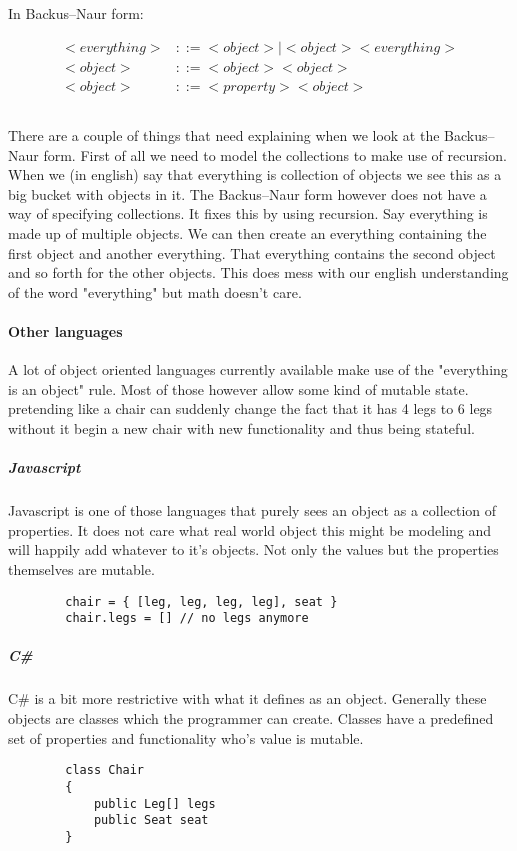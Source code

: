 \documentclass{scrartcl}
\begin{document}
    In Backus–Naur form:

    \begin{align*}
         <everything> &::= <object> | <object><everything> \\
         <object> &::= <object><object> \\
         <object> &::= <property><object> \\
    \end{align*}

    \subparagraph{}
    There are a couple of things that need explaining when we look
    at the Backus–Naur form. First of all we need to model the collections
    to make use of recursion. When we (in english) say that everything is 
    collection of objects we see this as a big bucket with objects in it.
    The Backus–Naur form however does not have a way of specifying 
    collections. It fixes this by using recursion. Say everything is
    made up of multiple objects. We can then create an everything containing the 
    first object and another everything. That everything contains the second
    object and so forth for the other objects. This does mess with our english
    understanding of the word "everything" but math doesn't care.

    \paragraph{Other languages}
    A lot of object oriented languages currently available make use of the
    "everything is an object" rule. Most of those however allow some kind of
    mutable state. pretending like a chair can suddenly change the fact that
    it has 4 legs to 6 legs without it begin a new chair with new
    functionality and thus being stateful. 

    \subparagraph{Javascript}
    Javascript is one of those languages that purely sees an object as a
    collection of properties. It does not care what real world object 
    this might be modeling and will happily add whatever to it's objects.
    Not only the values but the properties themselves are mutable.
    \begin{lstlisting}
        chair = { [leg, leg, leg, leg], seat }
        chair.legs = [] // no legs anymore
    \end{lstlisting}

    \subparagraph{C\#}
    C\# is a bit more restrictive with what it defines as an object. Generally
    these objects are classes which the programmer can create. Classes have a
    predefined set of properties and functionality who's value is mutable.
    \begin{lstlisting}
        class Chair
        {
            public Leg[] legs
            public Seat seat
        }
    \end{lstlisting}
    
\end{document}
